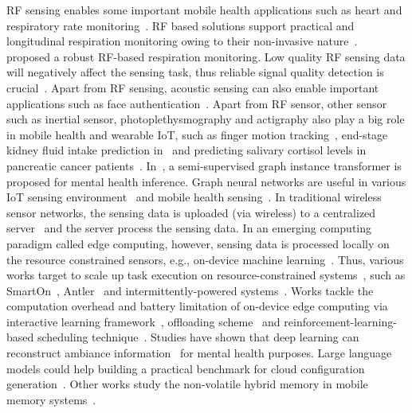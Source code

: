 RF sensing enables some important mobile health applications such as heart and respiratory rate monitoring~\cite{zongxing2022uwb,zongxing2022measure}. 
RF based solutions support practical and longitudinal respiration monitoring owing to their non-invasive nature~\cite{zongxing2023rf,zongxing2021uwb}.
~\cite{zongxing2024rfq} proposed a robust RF-based respiration monitoring.
Low quality RF sensing data will negatively affect the sensing task, thus reliable signal quality detection is crucial~\cite{zongxing2021quality}.
Apart from RF sensing, acoustic sensing can also enable important applications such as face authentication~\cite{zongxing2019face,zongxing2022face}.
Apart from RF sensor, other sensor such as inertial sensor, photoplethysmography and actigraphy also play a big role in mobile health and wearable IoT, 
such as finger motion tracking~\cite{yilin2021}, end-stage kidney fluid intake prediction in~\cite{guimin2022health} and predicting salivary cortisol levels in pancreatic cancer patients~\cite{guimin2021pancreatic}.
In~\cite{guimin2021health}, a semi-supervised graph instance transformer is proposed for mental health inference.
Graph neural networks are useful in various IoT sensing environment~\cite{guimin2023survey} and mobile health sensing~\cite{guimin_thesis}.
In traditional wireless sensor networks, the sensing data is uploaded (via wireless) to a centralized server~\cite{yubo2023blockchain} and the server process the sensing data.
In an emerging computing paradigm called edge computing, however, sensing data is processed locally on the resource constrained sensors, 
e.g., on-device machine learning~\cite{yubo2020ondevice,yubo2022demo,yubo2019ondevice}.
Thus, various works target to scale up task execution on resource-constrained systems~\cite{yubo_thesis}, such as 
SmartOn~\cite{yubo2021smarton}, Antler~\cite{yubo2023efficient} and intermittently-powered systems~\cite{yubo2023audio,yubo2023intermittent}.
Works tackle the computation overhead and battery limitation of on-device edge computing via 
interactive learning framework~\cite{zhou2022}, offloading scheme~\cite{zhou2023offloading} and reinforcement-learning-based scheduling technique~\cite{zhou2023}.
Studies have shown that deep learning can reconstruct ambiance information~\cite{wenwan} for mental health purposes.
Large language models could help building a practical benchmark for cloud configuration generation~\cite{yuning2023cloud}.
Other works study the non-volatile hybrid memory in mobile memory systems~\cite{feiwen2021,feiwen2021fpga,feiwen2022}.

